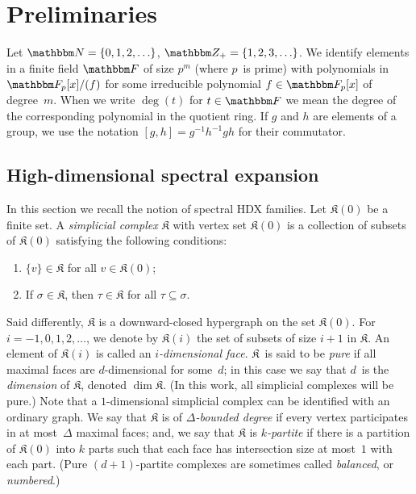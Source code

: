 \documentclass[10pt,a4paper]{article}
\theoremstyle{definition}
\newcommand{\N}{\mathbbm N}
\newcommand{\Z}{\mathbbm Z}
\newcommand{\F}{\mathbbm F}
\newcommand{\complex}{\mathfrak{K}}
\begin{document}
\section{Preliminaries}\label{sec:prelim}
Let $\N = \{0,1,2,\ldots\}$, $\Z_+ = \{1,2,3,\ldots\}$. We identify elements in a finite field $\F$ of size $p^m$ (where $p$~is prime) with polynomials in $\F_p[x]/(f)$ for some irreducible polynomial $f \in \F_p[x]$ of degree~$m$. When we write $\deg(t)$ for $t \in \F$ we mean the degree of the corresponding polynomial in the quotient ring.
If $g$ and $h$ are elements of a group, we use the notation $[g,h] = g^{-1}h^{-1}gh$ for their commutator. 

\subsection{High-dimensional spectral expansion}
In this section we recall the notion of spectral HDX families. Let $\complex(0)$ be a finite set. A \emph{simplicial complex} $\complex$ with vertex set $\complex(0)$ is a collection of subsets of $\complex(0)$ satisfying the following conditions:
\begin{enumerate}
\item $\{v\} \in \complex$ for all $v \in \complex(0)$;
\item If $\sigma \in \complex$, then $\tau \in \complex$ for all $\tau \subseteq \sigma$.
\end{enumerate}
Said differently, $\complex$ is a downward-closed hypergraph on the set $\complex(0)$.  For $i = -1, 0, 1, 2, \dots$, we denote by $\complex(i)$ the set of subsets of size $i+1$ in $\complex$. An element of $\complex(i)$ is called an \emph{$i$-dimensional face}. $\complex$~is said to be \emph{pure} if all maximal faces are $d$-dimensional for some~$d$; in this case we say that $d$~is the \emph{dimension} of $\complex$, denoted $\dim \complex$. (In this work, all simplicial complexes will be pure.)
Note that a $1$-dimensional simplicial complex can be identified with an ordinary graph.
We say that $\complex$ is of \emph{$\Delta$-bounded degree} if every vertex participates in at most~$\Delta$ maximal faces; and, we say that $\complex$ is \emph{$k$-partite} if there is a partition of $\complex(0)$ into $k$ parts such that each face has intersection size at most~$1$ with each part. (Pure $(d+1)$-partite complexes are sometimes called \emph{balanced}, or \emph{numbered}.)
\end{document}
